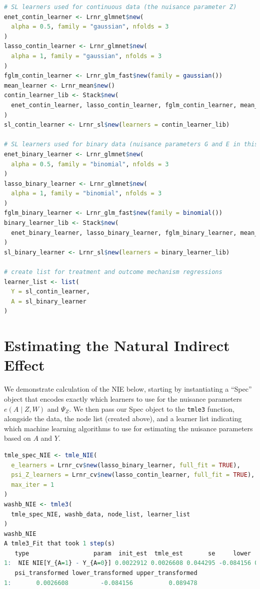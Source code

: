 \documentclass[12pt, krantz2,]{krantz}
\newcommand{\passthrough}[1]{#1}
\theoremstyle{definition}
\theoremstyle{definition}
\theoremstyle{definition}
\newcommand{\1}{\mathbbm{1}}
\begin{document}
\begin{lstlisting}[language=R]
# SL learners used for continuous data (the nuisance parameter Z)
enet_contin_learner <- Lrnr_glmnet$new(
  alpha = 0.5, family = "gaussian", nfolds = 3
)
lasso_contin_learner <- Lrnr_glmnet$new(
  alpha = 1, family = "gaussian", nfolds = 3
)
fglm_contin_learner <- Lrnr_glm_fast$new(family = gaussian())
mean_learner <- Lrnr_mean$new()
contin_learner_lib <- Stack$new(
  enet_contin_learner, lasso_contin_learner, fglm_contin_learner, mean_learner
)
sl_contin_learner <- Lrnr_sl$new(learners = contin_learner_lib)

# SL learners used for binary data (nuisance parameters G and E in this case)
enet_binary_learner <- Lrnr_glmnet$new(
  alpha = 0.5, family = "binomial", nfolds = 3
)
lasso_binary_learner <- Lrnr_glmnet$new(
  alpha = 1, family = "binomial", nfolds = 3
)
fglm_binary_learner <- Lrnr_glm_fast$new(family = binomial())
binary_learner_lib <- Stack$new(
  enet_binary_learner, lasso_binary_learner, fglm_binary_learner, mean_learner
)
sl_binary_learner <- Lrnr_sl$new(learners = binary_learner_lib)

# create list for treatment and outcome mechanism regressions
learner_list <- list(
  Y = sl_contin_learner,
  A = sl_binary_learner
)
\end{lstlisting}

\hypertarget{estimating-the-natural-indirect-effect}{%
\section{Estimating the Natural Indirect Effect}\label{estimating-the-natural-indirect-effect}}

We demonstrate calculation of the NIE below, starting by instantiating a ``Spec''
object that encodes exactly which learners to use for the nuisance parameters
\(e(A \mid Z, W)\) and \(\Psi_Z\). We then pass our Spec object to the \passthrough{\lstinline!tmle3!}
function, alongside the data, the node list (created above), and a learner list
indicating which machine learning algorithms to use for estimating the nuisance
parameters based on \(A\) and \(Y\).

\begin{lstlisting}[language=R]
tmle_spec_NIE <- tmle_NIE(
  e_learners = Lrnr_cv$new(lasso_binary_learner, full_fit = TRUE),
  psi_Z_learners = Lrnr_cv$new(lasso_contin_learner, full_fit = TRUE),
  max_iter = 1
)
washb_NIE <- tmle3(
  tmle_spec_NIE, washb_data, node_list, learner_list
)
washb_NIE
A tmle3_Fit that took 1 step(s)
   type                  param  init_est  tmle_est       se     lower    upper
1:  NIE NIE[Y_{A=1} - Y_{A=0}] 0.0022912 0.0026608 0.044295 -0.084156 0.089478
   psi_transformed lower_transformed upper_transformed
1:       0.0026608         -0.084156          0.089478
\end{lstlisting}
\end{document}
